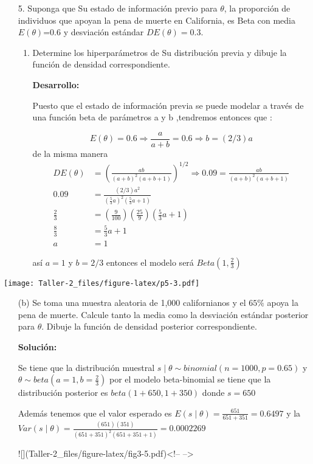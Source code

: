 \documentclass[
]{article}
\begin{document}
\begin{enumerate}
\item[5.]
Suponga que Su estado de información previo para $\theta$, la proporción de individuos que apoyan la pena de muerte en California, es Beta con media $E(\theta)$=0.6 y desviación estándar $DE(\theta)=0.3$.
  \begin{enumerate}
    \item Determine los hiperparámetros de Su distribución previa y dibuje la función de densidad correspondiente.
    
    \textbf{Desarrollo:} 
    
    Puesto que el estado de información previa se puede modelar a través de una función beta de parámetros a y b ,tendremos entonces que :
    
    \begin{equation*}
      E(\theta)=0.6 \Longrightarrow \frac{a}{a+b}=0.6 \Longrightarrow b=(2/3)a
    \end{equation*}
    de la misma manera
    \begin{align*}
        DE(\theta)&=(\frac{ab}{(a+b)^2(a+b+1)} )^{1/2} \Longrightarrow 0.09=\frac{ab}{(a+b)^2(a+b+1)}\\
                 0.09 &=\frac{(2/3)a^2}{(\frac{5}{3}a)^2(\frac{5}{3}a+1)}\\
               \frac{2}{3} &= (\frac{9}{100})(\frac{25}{9})(\frac{5}{3}a+1) \\
               \frac{8}{3} &=\frac{5}{3}a+1\\
               a&=1
    \end{align*}
    
    así $a=1$ y $b=2/3$ entonces el modelo será $Beta(1,\frac{2}{3})$
    

    
  \end{enumerate}
\end{enumerate}

\texttt{[image: Taller-2\_files/figure-latex/p5-3.pdf]}

\begin{enumerate}
  \item[(b)] Se toma una muestra aleatoria de 1,000 californianos y el $65\%$ apoya la pena de muerte. Calcule tanto la media     como la desviación estándar posterior para $\theta$. Dibuje la función de densidad posterior correspondiente.
    
    \textbf{Solución:}
    
      Se tiene que la distribución muestral $s \mid \theta \sim binomial (n=1000,p=0.65)$ y $\theta\sim               beta(a=1,b=\frac{2}{3})$  por el modelo beta-binomial se tiene que la distribución posterior es $beta(1+650,1+350)$ donde $s=650$
      
    Además tenemos que el valor esperado es $E(s\mid \theta)= \frac{651}{651+351}=0.6497$  y la $Var(s\mid \theta)=\frac{(651)(351)}{(651+351)^2(651+351+1)}=0.0002269$ 
      
![](Taller-2_files/figure-latex/fig3-5.pdf)<!-- --> 
  
      
\end{enumerate}
\end{document}
